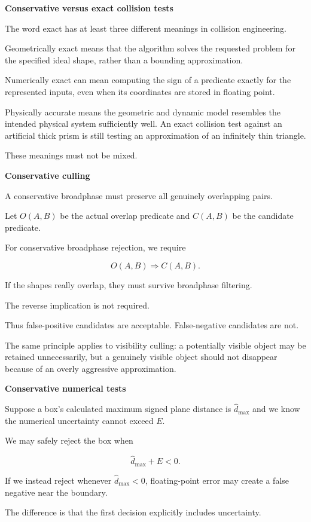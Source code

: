 \textbf{Conservative versus exact collision tests}

The word exact has at least three different meanings in collision engineering.

Geometrically exact means that the algorithm solves the requested problem for the specified ideal shape, rather than a bounding approximation.

Numerically exact can mean computing the sign of a predicate exactly for the represented inputs, even when its coordinates are stored in floating point.

Physically accurate means the geometric and dynamic model resembles the intended physical system sufficiently well. An exact collision test against an artificial thick prism is still testing an approximation of an infinitely thin triangle.

These meanings must not be mixed.

\textbf{Conservative culling}

A conservative broadphase must preserve all genuinely overlapping pairs.

Let \(O(A,B)\) be the actual overlap predicate and \(C(A,B)\) be the candidate predicate.

For conservative broadphase rejection, we require

\[
O(A,B)\Rightarrow C(A,B).
\]

If the shapes really overlap, they must survive broadphase filtering.

The reverse implication is not required.

Thus false-positive candidates are acceptable. False-negative candidates are not.

The same principle applies to visibility culling: a potentially visible object may be retained unnecessarily, but a genuinely visible object should not disappear because of an overly aggressive approximation.

\textbf{Conservative numerical tests}

Suppose a box's calculated maximum signed plane distance is \(\widehat d_{\max}\) and we know the numerical uncertainty cannot exceed \(E\).

We may safely reject the box when

\[
\widehat d_{\max}+E<0.
\]

If we instead reject whenever \(\widehat d_{\max}<0\), floating-point error may create a false negative near the boundary.

The difference is that the first decision explicitly includes uncertainty.

